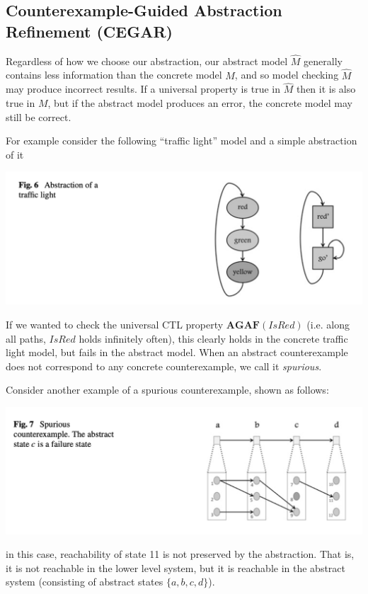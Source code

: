 \documentclass[10pt,a4paper]{article}
\begin{document}
\subsection*{Counterexample-Guided Abstraction Refinement (CEGAR)}


Regardless of how we choose our abstraction, our abstract model $\widehat{M}$ generally contains less information than the concrete model $M$, and so model checking $\widehat{M}$ may produce incorrect results. If a universal property is true in $\widehat{M}$ then it is also true in $M$, but if the abstract model produces an error, the concrete model may still be correct.

For example consider the following ``traffic light'' model and a simple abstraction of it
\begin{center}
    \includegraphics[scale=0.35]{images/cegar1.png}
\end{center}
If we wanted to check the universal CTL property $\textbf{AGAF}(IsRed)$ (i.e. along all paths, $IsRed$ holds infinitely often), this clearly holds in the concrete traffic light model, but fails in the abstract model. When an abstract counterexample does not correspond to any concrete counterexample, we call it \textit{spurious}.

Consider another example of a spurious counterexample, shown as follows:
\begin{center}
    \includegraphics[scale=0.40]{images/cegar2.png}
\end{center}
in this case, reachability of state 11 is not preserved by the abstraction. That is, it is not reachable in the lower level system, but it is reachable in the abstract system (consisting of abstract states $\{a,b,c,d\}$).
\end{document}
